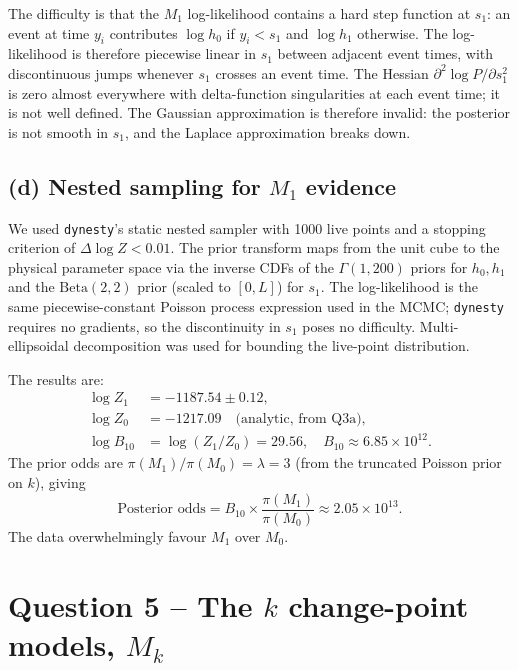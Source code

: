 \documentclass[11pt,a4paper]{article}
\begin{document}
The difficulty is that the $M_1$ log-likelihood contains a hard step function at $s_1$: an event at time $y_i$ contributes $\log h_0$ if $y_i < s_1$ and $\log h_1$ otherwise.
The log-likelihood is therefore piecewise linear in $s_1$ between adjacent event times, with discontinuous jumps whenever $s_1$ crosses an event time.
The Hessian $\partial^2 \log P / \partial s_1^2$ is zero almost everywhere with delta-function singularities at each event time; it is not well defined.
The Gaussian approximation is therefore invalid: the posterior is not smooth in $s_1$, and the Laplace approximation breaks down.

\subsection*{(d) Nested sampling for $M_1$ evidence}

We used \texttt{dynesty}'s static nested sampler with 1000 live points and a stopping criterion of $\Delta \log Z < 0.01$.
The prior transform maps from the unit cube to the physical parameter space via the inverse CDFs of the $\Gamma(1, 200)$ priors for $h_0, h_1$ and the $\text{Beta}(2, 2)$ prior (scaled to $[0, L]$) for $s_1$.
The log-likelihood is the same piecewise-constant Poisson process expression used in the MCMC; \texttt{dynesty} requires no gradients, so the discontinuity in $s_1$ poses no difficulty.
Multi-ellipsoidal decomposition was used for bounding the live-point distribution.

The results are:
\begin{align*}
  \log Z_1 &= -1187.54 \pm 0.12, \\
  \log Z_0 &= -1217.09 \quad\text{(analytic, from Q3a)}, \\
  \log B_{10} &= \log(Z_1/Z_0) = 29.56, \quad B_{10} \approx 6.85 \times 10^{12}.
\end{align*}
The prior odds are $\pi(M_1)/\pi(M_0) = \lambda = 3$ (from the truncated Poisson prior on $k$), giving
\[
  \text{Posterior odds} = B_{10} \times \frac{\pi(M_1)}{\pi(M_0)} \approx 2.05 \times 10^{13}.
\]
The data overwhelmingly favour $M_1$ over $M_0$.

\section*{Question 5 -- The $k$ change-point models, $M_k$}
\end{document}
